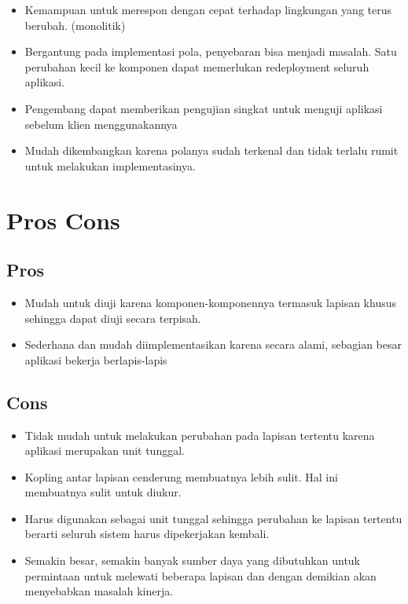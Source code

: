 \begin{itemize}
    \item Kemampuan untuk merespon dengan cepat terhadap lingkungan yang terus berubah. (monolitik)
    \item Bergantung pada implementasi pola, penyebaran bisa menjadi masalah. Satu perubahan kecil ke komponen dapat memerlukan redeployment seluruh aplikasi.
    \item Pengembang dapat memberikan pengujian singkat untuk menguji aplikasi sebelum klien menggunakannya
    \item Mudah dikembangkan karena polanya sudah terkenal dan tidak terlalu rumit untuk melakukan implementasinya.
\end{itemize}

\section{Pros Cons}

\subsection{Pros}

\begin{itemize}
    \item Mudah untuk diuji karena komponen-komponennya termasuk lapisan khusus sehingga dapat diuji secara terpisah.
    \item Sederhana dan mudah diimplementasikan karena secara alami, sebagian besar aplikasi bekerja berlapis-lapis
\end{itemize}

\subsection{Cons}

\begin{itemize}
    \item Tidak mudah untuk melakukan perubahan pada lapisan tertentu karena aplikasi merupakan unit tunggal.
    \item Kopling antar lapisan cenderung membuatnya lebih sulit. Hal ini membuatnya sulit untuk diukur.
    \item Harus digunakan sebagai unit tunggal sehingga perubahan ke lapisan tertentu berarti seluruh sistem harus dipekerjakan kembali.
    \item Semakin besar, semakin banyak sumber daya yang dibutuhkan untuk permintaan untuk melewati beberapa lapisan dan dengan demikian akan menyebabkan masalah kinerja.
\end{itemize}

